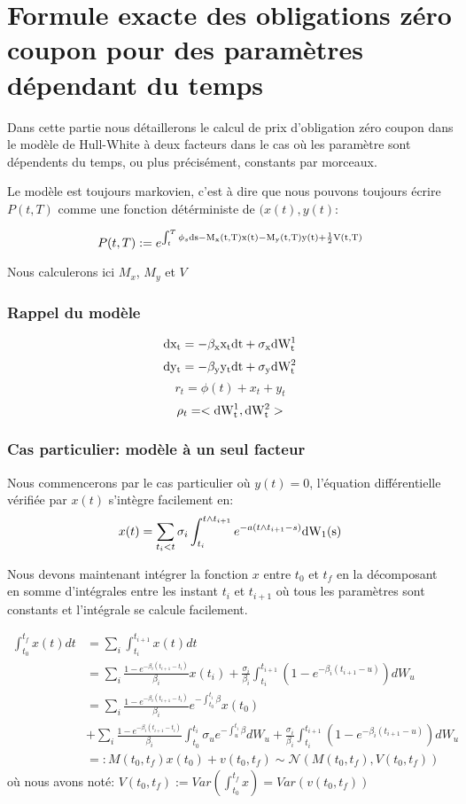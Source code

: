\chapter{Formule exacte des obligations zéro coupon pour des paramètres dépendant du temps}

Dans cette partie nous détaillerons le calcul de prix d'obligation zéro coupon dans le modèle de Hull-White à deux facteurs dans le cas où les paramètre sont dépendents du temps, ou plus précisément, constants par morceaux.

Le modèle est toujours markovien, c'est à dire que nous pouvons toujours écrire $P(t, T)$ comme une fonction détérministe de $(x(t), y(t)$:

$$P(t, T) := e^{\int_t^T \phi_s \rm{d}s - M_x(t, T) x(t) - M_y(t, T) y(t) + \frac{1}{2} V(t, T)}$$

Nous calculerons ici $M_x$, $M_y$ et $V$  

\subsection*{Rappel du modèle}
$$\rm{d}x_t = -\beta_x x_t \rm{d}t +  \sigma_x \rm{d} W^1_t $$
$$\rm{d}y_t = -\beta_y y_t \rm{d}t +  \sigma_y \rm{d} W^2_t $$
$$r_t =  \phi(t) + x_t  + y_t $$
$$\rho_t = <\rm{d} W^1_t, \rm{d} W^2_t>$$

\subsection*{Cas particulier: modèle à un seul facteur}
Nous commencerons par le cas particulier où $y(t) = 0$, l'équation différentielle vérifiée par $x(t)$ s'intègre facilement en:
$$x(t) = \sum_{t_i < t} \sigma_i  \int_{t_i}^{t \wedge t_{i+1}}  e^{- a (t \wedge t_{i+1}-s)}   \rm{d} W_1(s) $$

Nous devons maintenant intégrer la fonction $x$ entre $t_0$ et $t_f$ en la décomposant en somme d'intégrales entre les instant $t_i$ et $t_{i+1}$ où tous les paramètres sont constants et l'intégrale se calcule facilement.

\begin{align*}
\int_{t_0}^{t_f} x(t) dt &= \sum_i \int_{t_i}^{t_{i+1}} x(t) dt \\
&= \sum_i \frac{1 - e^{-\beta_i (t_{i+1} - t_i) }}{ \beta_i} x(t_i)
+ \frac{\sigma_i}{\beta_i} \int_{t_i}^{t_{i+1}} (1 - e^{-\beta_i (t_{i+1} - u)}) dW_u \\
&= \sum_i \frac{1 - e^{-\beta_i (t_{i+1} - t_i) }}{ \beta_i} e^{-\int_{t_0}^{t_i} \beta} x(t_0) \\
&+  \sum_i \frac{1 - e^{-\beta_i (t_{i+1} - t_i) }}{ \beta_i} \int_{t_0}^{t_i} \sigma_u e^{-\int_u^{t_i} \beta} dW_u
+ \frac{\sigma_i}{\beta_i} \int_{t_i}^{t_{i+1}} (1 - e^{-\beta_i (t_{i+1} - u)}) dW_u \\
&=: M(t_0, t_f) x(t_0) + v(t_0, t_f) \sim \mathcal{N}( M(t_0, t_f), V(t_0, t_f))
\end{align*}
où nous avons noté: $V(t_0, t_f) := Var( \int_{t_0}^{t_f} x ) = Var( v(t_0, t_f))$

